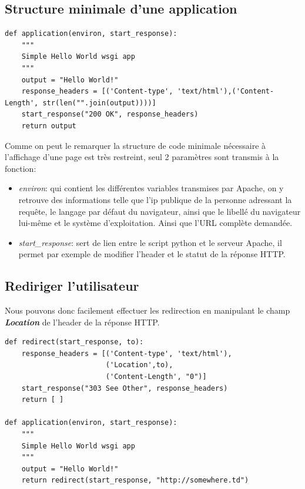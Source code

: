 \subsection*{Structure minimale d'une application}

\begin{verbatim}
def application(environ, start_response):
    """
    Simple Hello World wsgi app
    """
    output = "Hello World!"
    response_headers = [('Content-type', 'text/html'),('Content-Length', str(len("".join(output))))]
    start_response("200 OK", response_headers)
    return output
\end{verbatim}

Comme on peut le remarquer la structure de code minimale nécessaire à l'affichage d'une page est très restreint, seul 2 paramètres sont transmis à la fonction:
\begin{itemize}
	\item \textit{environ}: qui contient les différentes variables transmises par Apache, on y retrouve des informations telle que l'ip publique de la personne adressant la requête, le langage par défaut du navigateur, ainsi que le libellé du navigateur lui-même et le système d'exploitation. Ainsi que l'URL complète demandée.
	\item \textit{start\_response}: sert de lien entre le script python et le serveur Apache, il permet par exemple de modifier l'header et le statut de la réponse HTTP. 
\end{itemize}

\subsection*{Rediriger l'utilisateur}
Nous pouvons donc facilement effectuer les redirection en manipulant le champ \textbf{\textit{Location}} de l'header de la réponse HTTP.

\begin{verbatim}
def redirect(start_response, to):
    response_headers = [('Content-type', 'text/html'),
                        ('Location',to),
                        ('Content-Length', "0")]
    start_response("303 See Other", response_headers)
    return [ ]
    
def application(environ, start_response):
    """
    Simple Hello World wsgi app
    """
    output = "Hello World!"
    return redirect(start_response, "http://somewhere.td")
\end{verbatim}

\newpage

